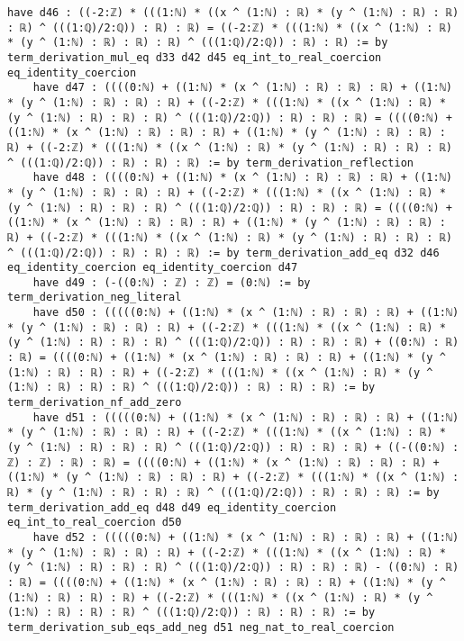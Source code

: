 \documentclass{article}
\begin{document}
\begin{tcolorbox}[colback=white!10, width=\linewidth]
\begin{lstlisting}[language=Lean4]
    have d46 : ((-2:ℤ) * (((1:ℕ) * ((x ^ (1:ℕ) : ℝ) * (y ^ (1:ℕ) : ℝ) : ℝ) : ℝ) ^ (((1:ℚ)/2:ℚ)) : ℝ) : ℝ) = ((-2:ℤ) * (((1:ℕ) * ((x ^ (1:ℕ) : ℝ) * (y ^ (1:ℕ) : ℝ) : ℝ) : ℝ) ^ (((1:ℚ)/2:ℚ)) : ℝ) : ℝ) := by term_derivation_mul_eq d33 d42 d45 eq_int_to_real_coercion eq_identity_coercion
    have d47 : ((((0:ℕ) + ((1:ℕ) * (x ^ (1:ℕ) : ℝ) : ℝ) : ℝ) + ((1:ℕ) * (y ^ (1:ℕ) : ℝ) : ℝ) : ℝ) + ((-2:ℤ) * (((1:ℕ) * ((x ^ (1:ℕ) : ℝ) * (y ^ (1:ℕ) : ℝ) : ℝ) : ℝ) ^ (((1:ℚ)/2:ℚ)) : ℝ) : ℝ) : ℝ) = ((((0:ℕ) + ((1:ℕ) * (x ^ (1:ℕ) : ℝ) : ℝ) : ℝ) + ((1:ℕ) * (y ^ (1:ℕ) : ℝ) : ℝ) : ℝ) + ((-2:ℤ) * (((1:ℕ) * ((x ^ (1:ℕ) : ℝ) * (y ^ (1:ℕ) : ℝ) : ℝ) : ℝ) ^ (((1:ℚ)/2:ℚ)) : ℝ) : ℝ) : ℝ) := by term_derivation_reflection
    have d48 : ((((0:ℕ) + ((1:ℕ) * (x ^ (1:ℕ) : ℝ) : ℝ) : ℝ) + ((1:ℕ) * (y ^ (1:ℕ) : ℝ) : ℝ) : ℝ) + ((-2:ℤ) * (((1:ℕ) * ((x ^ (1:ℕ) : ℝ) * (y ^ (1:ℕ) : ℝ) : ℝ) : ℝ) ^ (((1:ℚ)/2:ℚ)) : ℝ) : ℝ) : ℝ) = ((((0:ℕ) + ((1:ℕ) * (x ^ (1:ℕ) : ℝ) : ℝ) : ℝ) + ((1:ℕ) * (y ^ (1:ℕ) : ℝ) : ℝ) : ℝ) + ((-2:ℤ) * (((1:ℕ) * ((x ^ (1:ℕ) : ℝ) * (y ^ (1:ℕ) : ℝ) : ℝ) : ℝ) ^ (((1:ℚ)/2:ℚ)) : ℝ) : ℝ) : ℝ) := by term_derivation_add_eq d32 d46 eq_identity_coercion eq_identity_coercion d47
    have d49 : (-((0:ℕ) : ℤ) : ℤ) = (0:ℕ) := by term_derivation_neg_literal
    have d50 : (((((0:ℕ) + ((1:ℕ) * (x ^ (1:ℕ) : ℝ) : ℝ) : ℝ) + ((1:ℕ) * (y ^ (1:ℕ) : ℝ) : ℝ) : ℝ) + ((-2:ℤ) * (((1:ℕ) * ((x ^ (1:ℕ) : ℝ) * (y ^ (1:ℕ) : ℝ) : ℝ) : ℝ) ^ (((1:ℚ)/2:ℚ)) : ℝ) : ℝ) : ℝ) + ((0:ℕ) : ℝ) : ℝ) = ((((0:ℕ) + ((1:ℕ) * (x ^ (1:ℕ) : ℝ) : ℝ) : ℝ) + ((1:ℕ) * (y ^ (1:ℕ) : ℝ) : ℝ) : ℝ) + ((-2:ℤ) * (((1:ℕ) * ((x ^ (1:ℕ) : ℝ) * (y ^ (1:ℕ) : ℝ) : ℝ) : ℝ) ^ (((1:ℚ)/2:ℚ)) : ℝ) : ℝ) : ℝ) := by term_derivation_nf_add_zero
    have d51 : (((((0:ℕ) + ((1:ℕ) * (x ^ (1:ℕ) : ℝ) : ℝ) : ℝ) + ((1:ℕ) * (y ^ (1:ℕ) : ℝ) : ℝ) : ℝ) + ((-2:ℤ) * (((1:ℕ) * ((x ^ (1:ℕ) : ℝ) * (y ^ (1:ℕ) : ℝ) : ℝ) : ℝ) ^ (((1:ℚ)/2:ℚ)) : ℝ) : ℝ) : ℝ) + ((-((0:ℕ) : ℤ) : ℤ) : ℝ) : ℝ) = ((((0:ℕ) + ((1:ℕ) * (x ^ (1:ℕ) : ℝ) : ℝ) : ℝ) + ((1:ℕ) * (y ^ (1:ℕ) : ℝ) : ℝ) : ℝ) + ((-2:ℤ) * (((1:ℕ) * ((x ^ (1:ℕ) : ℝ) * (y ^ (1:ℕ) : ℝ) : ℝ) : ℝ) ^ (((1:ℚ)/2:ℚ)) : ℝ) : ℝ) : ℝ) := by term_derivation_add_eq d48 d49 eq_identity_coercion eq_int_to_real_coercion d50
    have d52 : (((((0:ℕ) + ((1:ℕ) * (x ^ (1:ℕ) : ℝ) : ℝ) : ℝ) + ((1:ℕ) * (y ^ (1:ℕ) : ℝ) : ℝ) : ℝ) + ((-2:ℤ) * (((1:ℕ) * ((x ^ (1:ℕ) : ℝ) * (y ^ (1:ℕ) : ℝ) : ℝ) : ℝ) ^ (((1:ℚ)/2:ℚ)) : ℝ) : ℝ) : ℝ) - ((0:ℕ) : ℝ) : ℝ) = ((((0:ℕ) + ((1:ℕ) * (x ^ (1:ℕ) : ℝ) : ℝ) : ℝ) + ((1:ℕ) * (y ^ (1:ℕ) : ℝ) : ℝ) : ℝ) + ((-2:ℤ) * (((1:ℕ) * ((x ^ (1:ℕ) : ℝ) * (y ^ (1:ℕ) : ℝ) : ℝ) : ℝ) ^ (((1:ℚ)/2:ℚ)) : ℝ) : ℝ) : ℝ) := by term_derivation_sub_eqs_add_neg d51 neg_nat_to_real_coercion

\end{lstlisting}
\end{tcolorbox}
\end{document}
